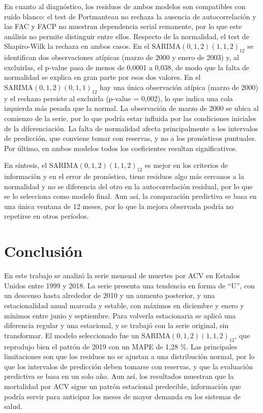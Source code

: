 \documentclass[
  spanish,
  11pt,
  letterpaper,
  DIV=11,
  numbers=noendperiod]{scrartcl}
\begin{document}
En cuanto al diagnóstico, los residuos de ambos modelos son compatibles
con ruido blanco: el test de Portmanteau no rechaza la ausencia de
autocorrelación y las FAC y FACP no muestran dependencia serial
remanente, por lo que este análisis no permite distinguir entre ellos.
Respecto de la normalidad, el test de Shapiro-Wilk la rechaza en ambos
casos. En el \(\text{SARIMA}(0,1,2)(1,1,2)_{12}\) se identifican dos
observaciones atípicas (marzo de 2000 y enero de 2003) y, al excluirlas,
el p-value pasa de menos de 0,0001 a 0,038, de modo que la falta de
normalidad se explica en gran parte por esos dos valores. En el
\(\text{SARIMA}(0,1,2)(0,1,1)_{12}\) hay una única observación atípica
(marzo de 2000) y el rechazo persiste al excluirla (p-value = 0,002), lo
que indica una cola izquierda más pesada que la normal. La observación
de marzo de 2000 se ubica al comienzo de la serie, por lo que podría
estar influida por las condiciones iniciales de la diferenciación. La
falta de normalidad afecta principalmente a los intervalos de
predicción, que conviene tomar con reservas, y no a los pronósticos
puntuales. Por último, en ambos modelos todos los coeficientes resultan
significativos.

En síntesis, el \(\text{SARIMA}(0,1,2)(1,1,2)_{12}\) es mejor en los
criterios de información y en el error de pronóstico, tiene residuos
algo más cercanos a la normalidad y no se diferencia del otro en la
autocorrelación residual, por lo que se lo selecciona como modelo final.
Aun así, la comparación predictiva se basa en una única ventana de 12
meses, por lo que la mejora observada podría no repetirse en otros
períodos.

\section{Conclusión}\label{conclusiuxf3n}

En este trabajo se analizó la serie mensual de muertes por ACV en
Estados Unidos entre 1999 y 2018. La serie presenta una tendencia en
forma de ``U'', con un descenso hasta alrededor de 2010 y un aumento
posterior, y una estacionalidad anual marcada y estable, con máximos en
diciembre y enero y mínimos entre junio y septiembre. Para volverla
estacionaria se aplicó una diferencia regular y una estacional, y se
trabajó con la serie original, sin transformar. El modelo seleccionado
fue un \(\text{SARIMA}(0,1,2)(1,1,2)_{12}\), que reprodujo bien el
patrón de 2019 con un MAPE de 1,28 \%. Las principales limitaciones son
que los residuos no se ajustan a una distribución normal, por lo que los
intervalos de predicción deben tomarse con reservas, y que la evaluación
predictiva se basa en un solo año. Aun así, los resultados muestran que
la mortalidad por ACV sigue un patrón estacional predecible, información
que podría servir para anticipar los meses de mayor demanda en los
sistemas de salud.
\end{document}
